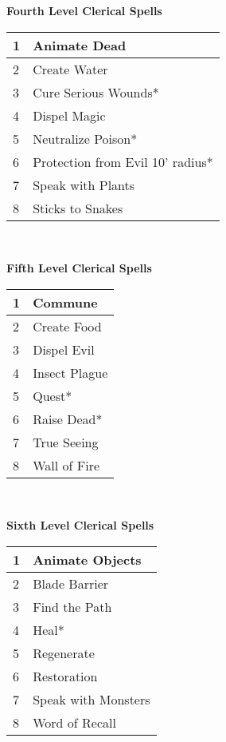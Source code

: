 \documentclass[a4paper,twoside,openany,10pt]{book}
\begin{document}
\begin{multicols}{2}
{\large \textbf{Fourth Level Clerical Spells}}

\begin{tabularx}{0.45\textwidth}{@{}ll@{}}
1 & Animate Dead \\\toprule
2 & Create Water \\\hline
3 & Cure Serious Wounds* \\\hline
4 & Dispel Magic \\\hline
5 & Neutralize Poison* \\\hline
6 & Protection from Evil 10' radius* \\\hline
7 & Speak with Plants \\\hline
8 & Sticks to Snakes \\\bottomrule
\end{tabularx}\\\bigskip

{\large \textbf{Fifth Level Clerical Spells}}

\begin{tabularx}{0.45\textwidth}{@{}ll@{}}
1 & Commune \\\toprule
2 & Create Food \\\hline
3 & Dispel Evil \\\hline
4 & Insect Plague \\\hline
5 & Quest* \\\hline
6 & Raise Dead* \\\hline
7 & True Seeing \\\hline
8 & Wall of Fire \\\bottomrule
\end{tabularx}\\\bigskip

{\large \textbf{Sixth Level Clerical Spells}}

\begin{tabularx}{0.45\textwidth}{@{}ll@{}}
1 & Animate Objects \\\toprule
2 & Blade Barrier \\\hline
3 & Find the Path \\\hline
4 & Heal* \\\hline
5 & Regenerate \\\hline
6 & Restoration \\\hline
7 & Speak with Monsters \\\hline
8 & Word of Recall \\\bottomrule
\end{tabularx}


\end{multicols}
\end{document}
